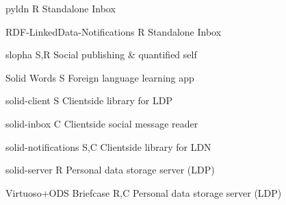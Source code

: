                                     
                                        \empty pyldn
                                        R
                                        Standalone Inbox
                                    
                                    
                                        \empty RDF-LinkedData-Notifications
                                        R
                                        Standalone Inbox
                                    
                                    
                                        \empty slopha
                                        S,R
                                        Social publishing \& quantified self
                                    
                                    
                                        \empty Solid Words
                                        S
                                        Foreign language learning app
                                    
                                    
                                        \empty solid-client
                                        S
                                        Clientside library for LDP
                                    
                                    
                                        \empty solid-inbox
                                        C
                                        Clientside social message reader
                                    
                                    
                                        \empty solid-notifications
                                        S,C
                                        Clientside library for LDN
                                    
                                    
                                        \empty solid-server
                                        R
                                        Personal data storage server (LDP)
                                    
                                    
                                        \empty Virtuoso+\empty ODS Briefcase
                                        R,C
                                        Personal data storage server (LDP)
                                    
                                
                            

